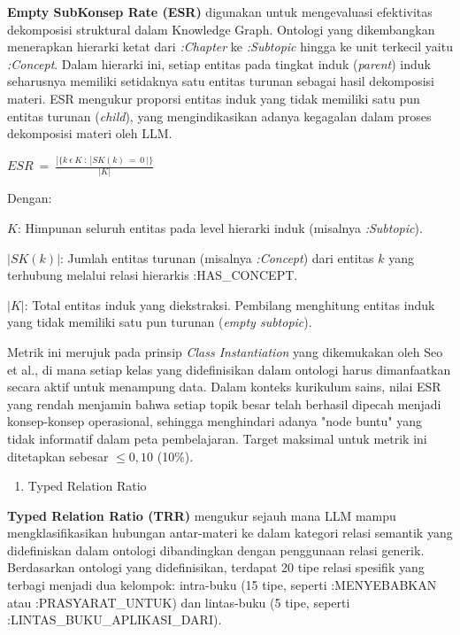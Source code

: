 \documentclass[
]{article}
\begin{document}
\textbf{Empty SubKonsep Rate (ESR)} digunakan untuk mengevaluasi
efektivitas dekomposisi struktural dalam Knowledge Graph. Ontologi yang
dikembangkan menerapkan hierarki ketat dari \emph{:Chapter} ke
\emph{:Subtopic} hingga ke unit terkecil yaitu \emph{:Concept}. Dalam
hierarki ini, setiap entitas pada tingkat induk (\emph{parent}) induk
seharusnya memiliki setidaknya satu entitas turunan sebagai hasil
dekomposisi materi. ESR mengukur proporsi entitas induk yang tidak
memiliki satu pun entitas turunan (\emph{child}), yang mengindikasikan
adanya kegagalan dalam proses dekomposisi materi oleh LLM.

\(ESR\  = \ \frac{|\{ k\ \epsilon\ K\ :\ |SK(k)\  = \ 0\ |\}}{|K|}\)

Dengan:

\(K\): Himpunan seluruh entitas pada level hierarki induk (misalnya
\emph{:Subtopic}).

\(|SK(k)|\): Jumlah entitas turunan (misalnya \emph{:Concept}) dari
entitas \(k\) yang terhubung melalui relasi hierarkis :HAS\_CONCEPT.

\(|K|\): Total entitas induk yang diekstraksi. Pembilang menghitung
entitas induk yang tidak memiliki satu pun turunan (\emph{empty
subtopic}).

Metrik ini merujuk pada prinsip \emph{Class Instantiation} yang
dikemukakan oleh Seo et al., di mana setiap kelas yang didefinisikan
dalam ontologi harus dimanfaatkan secara aktif untuk menampung data.
Dalam konteks kurikulum sains, nilai ESR yang rendah menjamin bahwa
setiap topik besar telah berhasil dipecah menjadi konsep-konsep
operasional, sehingga menghindari adanya "node buntu" yang tidak
informatif dalam peta pembelajaran. Target maksimal untuk metrik ini
ditetapkan sebesar \(\leq 0,10\) (10\%).

\begin{enumerate}
\def\labelenumi{\alph{enumi}.}
\setcounter{enumi}{2}
\item
  Typed Relation Ratio
\end{enumerate}

\textbf{Typed Relation Ratio (TRR)} mengukur sejauh mana LLM mampu
mengklasifikasikan hubungan antar-materi ke dalam kategori relasi
semantik yang didefiniskan dalam ontologi dibandingkan dengan penggunaan
relasi generik. Berdasarkan ontologi yang didefinisikan, terdapat 20
tipe relasi spesifik yang terbagi menjadi dua kelompok: intra-buku (15
tipe, seperti :MENYEBABKAN atau :PRASYARAT\_UNTUK) dan lintas-buku (5
tipe, seperti :LINTAS\_BUKU\_APLIKASI\_DARI).
\end{document}
